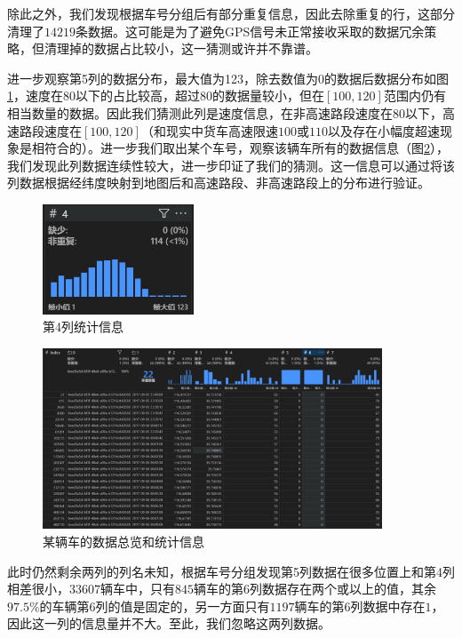\documentclass[UTF8]{ctexart}
\begin{document}
除此之外，我们发现根据车号分组后有部分重复信息，因此去除重复的行，这部分清理了$14219$条数据。这可能是为了避免GPS信号未正常接收采取的数据冗余策略，但清理掉的数据占比较小，这一猜测或许并不靠谱。

进一步观察第5列的数据分布，最大值为123，除去数值为$0$的数据后数据分布如图\ref{4-stat}，速度在80以下的占比较高，超过80的数据量较小，但在$[100,120]$范围内仍有相当数量的数据。因此我们猜测此列是速度信息，在非高速路段速度在$80$以下，高速路段速度在$[100,120]$（和现实中货车高速限速$100$或$110$以及存在小幅度超速现象是相符合的）。进一步我们取出某个车号，观察该辆车所有的数据信息（图\ref{v}），我们发现此列数据连续性较大，进一步印证了我们的猜测。这一信息可以通过将该列数据根据经纬度映射到地图后和高速路段、非高速路段上的分布进行验证。

\begin{figure}[!htb]
    \centering
    \includegraphics[width = 0.4\textwidth]{../img/pre/4列统计信息.png}
    \caption{第4列统计信息}
    \label{4-stat}
\end{figure}

\begin{figure}[!htb]
    \centering
    \includegraphics[width = 0.9\textwidth]{../img/pre/速度推断信息.png}
    \caption{某辆车的数据总览和统计信息}
    \label{v}
\end{figure}

此时仍然剩余两列的列名未知，根据车号分组发现第5列数据在很多位置上和第4列相差很小，$33607$辆车中，只有$845$辆车的第6列数据存在两个或以上的值，其余$97.5\%$的车辆第6列的值是固定的，另一方面只有$1197$辆车的第6列数据中存在$1$，因此这一列的信息量并不大。至此，我们忽略这两列数据。
\end{document}
